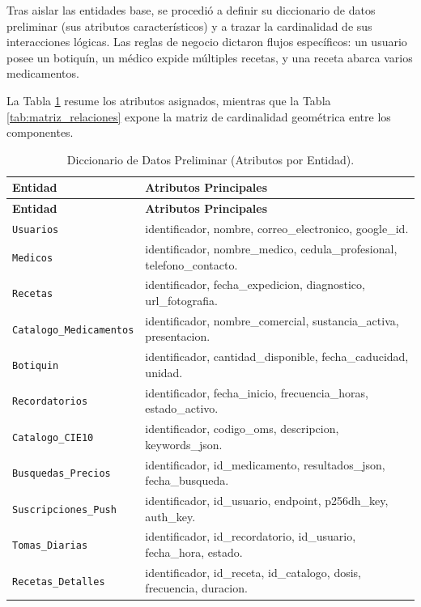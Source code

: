 Tras aislar las entidades base, se procedió a definir su diccionario de datos preliminar (sus atributos característicos) y a trazar la cardinalidad de sus interacciones lógicas. Las reglas de negocio dictaron flujos específicos: un usuario posee un botiquín, un médico expide múltiples recetas, y una receta abarca varios medicamentos. 

La Tabla \ref{tab:atributos_entidades} resume los atributos asignados, mientras que la Tabla \ref{tab:matriz_relaciones} expone la matriz de cardinalidad geométrica entre los componentes.

\begin{longtable}{|p{}|p{}|}
\caption{Diccionario de Datos Preliminar (Atributos por Entidad).}
\label{tab:atributos_entidades} \\
\hline
\textbf{Entidad} & \textbf{Atributos Principales} \\
\hline
\endfirsthead
\hline
\textbf{Entidad} & \textbf{Atributos Principales} \\
\hline
\endhead
\hline
\endfoot
\hline
\endlastfoot
\texttt{Usuarios} & identificador, nombre, correo\_electronico, google\_id. \\
\hline
\texttt{Medicos} & identificador, nombre\_medico, cedula\_profesional, telefono\_contacto. \\
\hline
\texttt{Recetas} & identificador, fecha\_expedicion, diagnostico, url\_fotografia. \\
\hline
\texttt{Catalogo\_Medicamentos}& identificador, nombre\_comercial, sustancia\_activa, presentacion. \\
\hline
\texttt{Botiquin} & identificador, cantidad\_disponible, fecha\_caducidad, unidad. \\
\hline
\texttt{Recordatorios} & identificador, fecha\_inicio, frecuencia\_horas, estado\_activo. \\
\hline
\texttt{Catalogo\_CIE10} & identificador, codigo\_oms, descripcion, keywords\_json. \\
\hline
\texttt{Busquedas\_Precios} & identificador, id\_medicamento, resultados\_json, fecha\_busqueda. \\
\hline
\texttt{Suscripciones\_Push} & identificador, id\_usuario, endpoint, p256dh\_key, auth\_key. \\
\hline
\texttt{Tomas\_Diarias} & identificador, id\_recordatorio, id\_usuario, fecha\_hora, estado. \\
\hline
\texttt{Recetas\_Detalles} & identificador, id\_receta, id\_catalogo, dosis, frecuencia, duracion. \\
\hline
\end{longtable}

